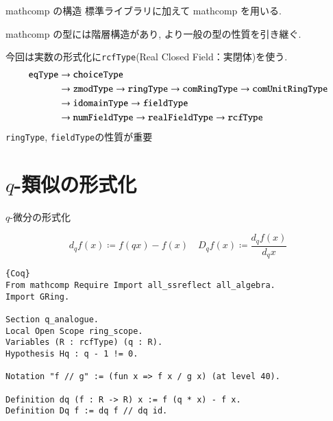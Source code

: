\documentclass[dvipdfmx,cjk]{beamer}
\theoremstyle{mystyle}
\newcommand{\0}{\textbf{0}}
\begin{document}

\begin{frame}{mathcomp の構造}
	標準ライブラリ\cite{coq sl}に加えて mathcomp \cite{coq mc}を用いる. \pause
	
	mathcomp の型には階層構造があり, より一般の型の性質を引き継ぐ. \pause
	
	今回は実数の形式化に{\tt rcfType}(Real Closed Field：実閉体)を使う. \pause
	\begin{align*}
		{\tt eqType} &\to {\tt choiceType} \\
		                  &\to {\tt zmodType} \to {\tt ringType} \to 
		                          {\tt comRingType} \to {\tt comUnitRingType}\\
							  &\to {\tt idomainType} \to {\tt fieldType}\\
		                  &\to {\tt numFieldType} \to {\tt realFieldType} \to {\tt rcfType}
	\end{align*} \pause
	{\tt ringType}, {\tt fieldType}の性質が重要
\end{frame}
\section{$q$-類似の形式化}

\begin{frame}
  \tableofcontents[currentsection] 
\end{frame}

\begin{frame}[fragile]{$q$-微分の形式化}
	\begin{screen}
		\[
			d_q f (x) \coloneqq f(qx) - f(x) \quad D_q f (x) \coloneqq \frac{d_q f(x)}{d_q x}
		\]
	\end{screen} \pause
	\begin{lstlisting}{Coq}
From mathcomp Require Import all_ssreflect all_algebra.
Import GRing.

Section q_analogue.
Local Open Scope ring_scope.
Variables (R : rcfType) (q : R).
Hypothesis Hq : q - 1 != 0.

Notation "f // g" := (fun x => f x / g x) (at level 40).

Definition dq (f : R -> R) x := f (q * x) - f x.
Definition Dq f := dq f // dq id. \end{lstlisting}
\end{frame}
\end{document}
